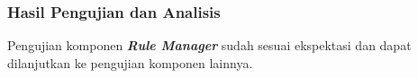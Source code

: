 \subsubsection{Hasil Pengujian dan Analisis}


Pengujian komponen \textbf{\textit{Rule Manager}} sudah sesuai ekspektasi dan dapat dilanjutkan ke pengujian komponen lainnya.